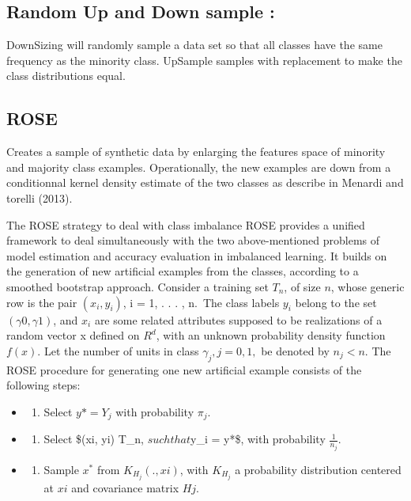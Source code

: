 \documentclass[
]{report}
\providecommand{\tightlist}{%
  \setlength{\itemsep}{0pt}\setlength{\parskip}{0pt}}
\begin{document}
\hypertarget{random-up-and-down-sample}{%
\subsection{Random Up and Down sample :}\label{random-up-and-down-sample}}

DownSizing will randomly sample a data set so that all classes have the same frequency as the minority class. UpSample samples with replacement to make the class distributions equal.

\hypertarget{rose}{%
\subsection{ROSE}\label{rose}}

Creates a sample of synthetic data by enlarging the features space of minority and majority class examples. Operationally, the new examples are down from a conditionnal kernel density estimate of the two classes as describe in Menardi and torelli (2013).

The ROSE strategy to deal with class imbalance ROSE \citep{ROSE} provides a unified framework to deal simultaneously with the two above-mentioned problems of model estimation and accuracy evaluation in imbalanced learning. It builds on the generation of new artificial examples from the classes, according to a smoothed bootstrap approach.
Consider a training set \(T_n\), of size \(n\), whose generic row is the pair \((x_i, y_i)\), i = 1, . . . , n.~The class
labels \(y_i\) belong to the set \((\gamma0, \gamma1)\), and \(x_i\) are some related attributes supposed to be realizations of a random vector x defined on \(R^d\), with an unknown probability density function \(f (x)\). Let the number of units in class \(\gamma_j, j = 0, 1,\) be denoted by \(n_j < n\). The ROSE procedure for generating one new artificial
example consists of the following steps:

\begin{itemize}
\item
  \begin{enumerate}
  \def\labelenumi{\arabic{enumi}.}
  \tightlist
  \item
    Select \(y* = Y_j\) with probability \(\pi_j\).
  \end{enumerate}
\item
  \begin{enumerate}
  \def\labelenumi{\arabic{enumi}.}
  \setcounter{enumi}{1}
  \tightlist
  \item
    Select \$(xi, yi) \in T\_n, \(such that\)y\_i = y*\$, with probability \(\frac{1}{n_j}\).
  \end{enumerate}
\item
  \begin{enumerate}
  \def\labelenumi{\arabic{enumi}.}
  \setcounter{enumi}{2}
  \tightlist
  \item
    Sample \(x^*\) from \(K_{H_j} (.,xi)\), with \(K_{H_j}\) a probability distribution centered at \(xi\) and covariance matrix \(Hj\).
  \end{enumerate}
\end{itemize}
\end{document}
